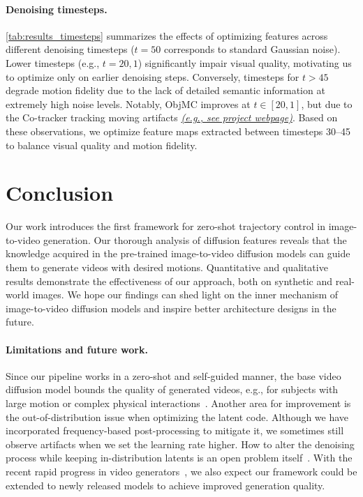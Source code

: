 \documentclass{article} \usepackage{iclr2025_conference,times}
\begin{document}
\paragraph{Denoising timesteps.}
\cref{tab:results_timesteps} summarizes the effects of optimizing features across different denoising timesteps ($t=50$ corresponds to standard Gaussian noise).
Lower timesteps (e.g., $t=20,1$) significantly impair visual quality, motivating us to optimize only on earlier denoising steps.
Conversely, timesteps for  $t>45$ degrade motion fidelity due to the lack of detailed semantic information at extremely high noise levels.
Notably, ObjMC improves at $t \in [20, 1]$, but due to the Co-tracker tracking moving artifacts \href{https://kmcode1.github.io/Projects/SG-I2V/gallery_timestep2.html}{\textit{(e.g., see project webpage)}}.
Based on these observations, we optimize feature maps extracted between timesteps 30--45 to balance visual quality and motion fidelity.


 \vspace{-3.0mm}
\section{Conclusion}
\label{sec:conclusion}
\vspace{-2.0mm}
Our work introduces the first framework for zero-shot trajectory control in image-to-video generation.
Our thorough analysis of diffusion features reveals that the knowledge acquired in the pre-trained image-to-video diffusion models can guide them to generate videos with desired motions. Quantitative and qualitative results demonstrate the effectiveness of our approach, both on synthetic and real-world images.
We hope our findings can shed light on the inner mechanism of image-to-video diffusion models and inspire better architecture designs in the future.

\vspace{-2.0mm}
\paragraph{Limitations and future work.}
Since our pipeline works in a zero-shot and self-guided manner, the base video diffusion model bounds the quality of generated videos, e.g., for subjects with large motion or complex physical interactions~\citep{blattmann2023stable}.
Another area for improvement is the out-of-distribution issue when optimizing the latent code. Although we have incorporated frequency-based post-processing to mitigate it, we sometimes still observe artifacts when we set the learning rate higher.
How to alter the denoising process while keeping in-distribution latents is an open problem itself~\citep{he2023manifold,ReNoiseInversion}.
With the recent rapid progress in video generators~\citep{Sora,WALT}, we also expect our framework could be extended to newly released models to achieve improved generation quality. 
\end{document}
